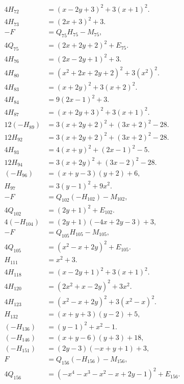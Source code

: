 \documentclass[11pt]{article}
\begin{document}
\begin{align}
4H_{72}&=(x-2y+3)^2+3(x+1)^2.\label{eq:sign72}\\
4H_{73}&=(2x+3)^2+3.\label{eq:sign73}\\
-F&=Q_{75}H_{75}-M_{75},\label{eq:sign75}\\
4Q_{75}&=(2x+2y+2)^2+E_{75}.\label{eq:sign75b}\\
4H_{76}&=(2x-2y+1)^2+3.\label{eq:sign76}\\
4H_{80}&=(x^{2}+2x+2y+2)^2+3(x^{2})^2.\label{eq:sign80}\\
4H_{83}&=(x+2y)^2+3(x+2)^2.\label{eq:sign83}\\
4H_{84}&=9(2x-1)^2+3.\label{eq:sign84}\\
4H_{87}&=(x+2y+3)^2+3(x+1)^2.\label{eq:sign87}\\
12(-H_{89})&=3(x+2y+2)^2+(3x+2)^2-28.\label{eq:sign89}\\
12H_{92}&=3(x+2y+2)^2+(3x+2)^2-28.\label{eq:sign92}\\
4H_{93}&=4(x+y)^2+(2x-1)^2-5.\label{eq:sign93}\\
12H_{94}&=3(x+2y)^2+(3x-2)^2-28.\label{eq:sign94}\\
(-H_{96})&=(x+y-3)(y+2)+6,\label{eq:sign96}\\
H_{97}&=3(y-1)^2+9x^2.\label{eq:sign97}\\
-F&=Q_{102}(-H_{102})-M_{102},\label{eq:sign102}\\
4Q_{102}&=(2y+1)^2+E_{102}.\label{eq:sign102b}\\
4(-H_{104})&=(2y+1)(-4x+2y-3)+3,\label{eq:sign104}\\
-F&=Q_{105}H_{105}-M_{105},\label{eq:sign105}\\
4Q_{105}&=(x^{2}-x+2y)^2+E_{105}.\label{eq:sign105b}\\
H_{111}&=x^2+3.\label{eq:sign111}\\
4H_{118}&=(x-2y+1)^2+3(x+1)^2.\label{eq:sign118}\\
4H_{120}&=(2x^{2}+x-2y)^2+3x^2.\label{eq:sign120}\\
4H_{123}&=(x^{2}-x+2y)^2+3(x^{2}-x)^2.\label{eq:sign123}\\
H_{132}&=(x+y+3)(y-2)+5,\label{eq:sign132}\\
(-H_{136})&=(y-1)^2+x^2-1.\label{eq:sign136}\\
(-H_{146})&=(x+y-6)(y+3)+18,\label{eq:sign146}\\
(-H_{151})&=(2y-3)(-x+y+1)+3,\label{eq:sign151}\\
F&=Q_{156}(-H_{156})-M_{156},\label{eq:sign156}\\
4Q_{156}&=(-x^{4}-x^{3}-x^{2}-x+2y-1)^2+E_{156}.\label{eq:sign156b}\\

\end{align}
\end{document}
